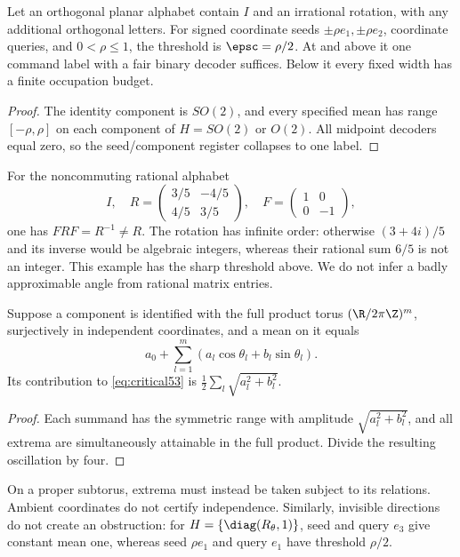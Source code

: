 \begin{corollary}\label{cor:circle53}
Let an orthogonal planar alphabet contain $I$ and an irrational rotation, with any additional orthogonal letters. For signed coordinate seeds $\pm\rho e_1,\pm\rho e_2$, coordinate queries, and $0<\rho\le1$, the threshold is $\epsc=\rho/2$. At and above it one command label with a fair binary decoder suffices. Below it every fixed width has a finite occupation budget.
\end{corollary}
\begin{proof}
The identity component is $SO(2)$, and every specified mean has range $[-\rho,\rho]$ on each component of $H=SO(2)$ or $O(2)$. All midpoint decoders equal zero, so the seed/component register collapses to one label.
\end{proof}
For the noncommuting rational alphabet
\[
 I,\quad R=\begin{pmatrix}3/5&-4/5\\4/5&3/5\end{pmatrix},\quad
 F=\begin{pmatrix}1&0\\0&-1\end{pmatrix},
\]
one has $FRF=R^{-1}\ne R$. The rotation has infinite order: otherwise $(3+4i)/5$ and its inverse would be algebraic integers, whereas their rational sum $6/5$ is not an integer. This example has the sharp threshold above. We do not infer a badly approximable angle from rational matrix entries.

\begin{proposition}\label{prop:torus53}
Suppose a component is identified with the full product torus $(\R/2\pi\Z)^m$, surjectively in independent coordinates, and a mean on it equals
\[
 a_0+\sum_{l=1}^m(a_l\cos\theta_l+b_l\sin\theta_l).
\]
Its contribution to \eqref{eq:critical53} is $\tfrac12\sum_l\sqrt{a_l^2+b_l^2}$.
\end{proposition}
\begin{proof}
Each summand has the symmetric range with amplitude $\sqrt{a_l^2+b_l^2}$, and all extrema are simultaneously attainable in the full product. Divide the resulting oscillation by four.
\end{proof}
On a proper subtorus, extrema must instead be taken subject to its relations. Ambient coordinates do not certify independence. Similarly, invisible directions do not create an obstruction: for $H=\{\diag(R_\theta,1)\}$, seed and query $e_3$ give constant mean one, whereas seed $\rho e_1$ and query $e_1$ have threshold $\rho/2$.

